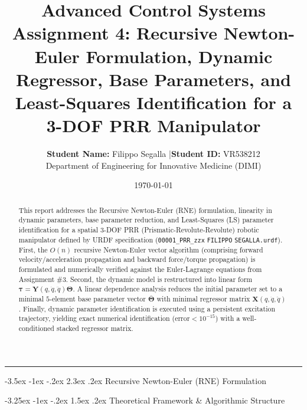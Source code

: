 \documentclass[11pt, a4paper]{article}
\title{
    \vspace{-1cm}
    \color{brandblue}\textbf{Advanced Control Systems}\\[0.3em]
    \Large\textbf{Assignment 4: Recursive Newton-Euler Formulation, Dynamic Regressor, Base Parameters, and Least-Squares Identification for a 3-DOF PRR Manipulator}
}
\author{\textbf{Student Name:} Filippo Segalla \quad|\quad \textbf{Student ID:} VR538212\\[0.2em]
\small Department of Engineering for Innovative Medicine (DIMI) }
\date{\today}
\makeatletter
\renewcommand{\section}{\@startsection{section}{1}{\z@}%
    {-3.5ex \@plus -1ex \@minus -.2ex}%
    {2.3ex \@plus .2ex}%
    {\normalfont\Large\bfseries\color{brandblue}}}
\renewcommand{\subsection}{\@startsection{subsection}{2}{\z@}%
    {-3.25ex \@plus -1ex \@minus -.2ex}%
    {1.5ex \@plus .2ex}%
    {\normalfont\large\bfseries\color{brandaccent}}}
\makeatother
\begin{document}
\maketitle
\thispagestyle{empty}

\begin{abstract}
\noindent 
This report addresses the Recursive Newton-Euler (RNE) formulation, linearity in dynamic parameters, base parameter reduction, and Least-Squares (LS) parameter identification for a spatial 3-DOF PRR (Prismatic-Revolute-Revolute) robotic manipulator defined by URDF specification (\texttt{00001\_PRR\_zzx} \texttt{FILIPPO} \texttt{SEGALLA.urdf}). First, the $O(n)$ recursive Newton-Euler vector algorithm (comprising forward velocity/acceleration propagation and backward force/torque propagation) is formulated and numerically verified against the Euler-Lagrange equations from Assignment \#3. Second, the dynamic model is restructured into linear form $\boldsymbol{\tau} = \mathbf{Y}(q, \dot{q}, \ddot{q})\boldsymbol{\Theta}$. A linear dependence analysis reduces the initial parameter set to a minimal $5$-element base parameter vector $\bar{\boldsymbol{\Theta}}$ with minimal regressor matrix $\mathbf{X}(q, \dot{q}, \ddot{q})$. Finally, dynamic parameter identification is executed using a persistent excitation trajectory, yielding exact numerical identification ($\text{error} < 10^{-15}$) with a well-conditioned stacked regressor matrix.
\end{abstract}

\hrule
\vspace{1.5em}

\section{Recursive Newton-Euler (RNE) Formulation}

\subsection{Theoretical Framework \& Algorithmic Structure}
\end{document}
